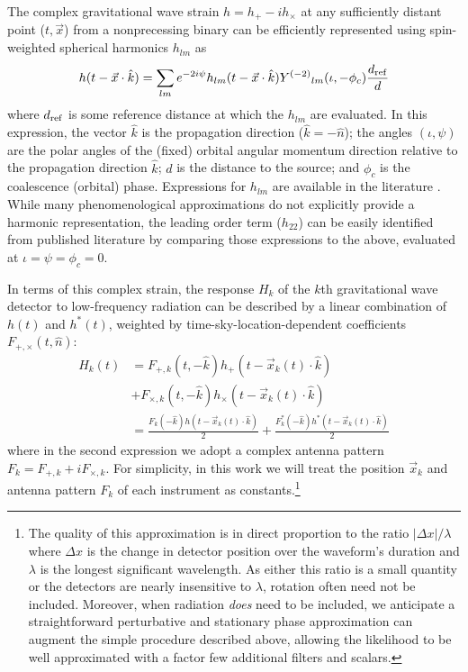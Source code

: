 The complex gravitational wave strain $h=h_+-ih_\times $ at any sufficiently distant point ($t,\vec{x}$) from a nonprecessing
 binary can be efficiently represented using spin-weighted spherical harmonics $h_{lm}$ as
\begin{align}
\label{eq:h:Expansion}
h(t-\vec{x}\cdot \hat{k}) = \sum_{lm} e^{-2i\psi} h_{lm}(t-\vec{x}\cdot \hat{k})  Y^{(-2)}{}_{lm}(\iota,-\phi_c)  \frac{d_{\rm ref}}{d}
\end{align}
where $d_{\rm ref}$ is some reference distance at which the $h_{lm}$ are evaluated.  
In this expression, the vector $\hat{k}$ is the propagation direction ($\hat{k}=-\hat{n}$); the angles $(\iota,\psi)$ are the polar angles of the (fixed) orbital angular momentum direction
relative to the propagation direction $\hat{k}$; $d$ is the distance to the source; and $\phi_c$ is the coalescence
(orbital) phase. 
Expressions for $h_{lm}$ are available in the literature 
\cite{gwastro-pn-MultipoleMomentsNonspinning, gw-astro-mergers-approximations-SpinningPNHigherHarmonics}.  While many
phenomenological approximations do not explicitly provide a harmonic representation, the leading order term ($h_{22}$) can be
easily  identified from published literature by comparing those expressions to the above, evaluated at $\iota=\psi=\phi_c=0$.
  
%
In terms of this complex strain, the response $H_k$ of the $k$th   gravitational wave detector to low-frequency
radiation \cite{gwastro-GroundBasedResponse-Whelan2008} can
be described by a linear combination of $h(t)$ and $h^*(t)$, weighted by time-sky-location-dependent coefficients $F_{+,\times}(t,\hat{n})$:
\begin{align}
H_k(t) &=F_{+,k}(t,-\hat{k}) h_+(t-\vec{x}_k(t)\cdot \hat{k}) \nonumber \\
 & + F_{\times,k}(t,-\hat{k}) h_\times(t-\vec{x}_k(t)\cdot \hat{k}) \nonumber \\
 &=  \frac{F_k(-\hat{k}) h(t-\vec{x}_k(t)\cdot \hat{k}) }{2} + \frac{F_k^*(-\hat{k})h^*(t-\vec{x}_k(t)\cdot \hat{k})}{2}
\label{eq:Hh}
\end{align}
where in the second expression we adopt a complex antenna pattern $F_k=F_{+,k}+i F_{\times,k}$.  
%
For simplicity, in this work we will treat the position $\vec{x}_k$ and antenna pattern $F_k$ of each instrument as
constants.\footnote{The quality of this approximation is in direct proportion to the ratio $|\Delta x|/\lambda$ where
  $\Delta x$ is the change in detector position over the waveform's duration and $\lambda$ is the longest significant
  wavelength.   As either this ratio is a small quantity or the detectors are nearly insensitive to $\lambda$,
  rotation often need not be included.  Moreover, when radiation \emph{does} need to be included, we anticipate a straightforward perturbative and stationary phase
  approximation can augment the simple procedure described above, allowing the likelihood to be well approximated with
  a factor few additional filters and scalars.
}



